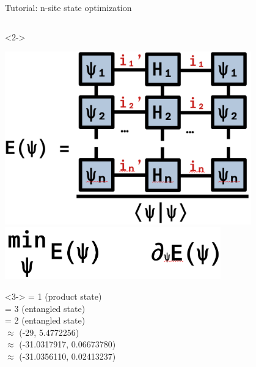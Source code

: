 \begin{frame}[fragile]{Tutorial: n-site state optimization}
\begin{columns}
\begin{column}{5.5cm}
\begin{onlyenv}<2->
\vspace*{0.0cm}
\begin{center}
\includegraphics[width=0.8\textwidth]{
  slides/assets/psin_H_psin.png
} \\
\includegraphics[width=0.7\textwidth]{
  slides/assets/min_grad_E_psi.png
}
\end{center}
\vspace*{0.0cm}
\end{onlyenv}

\begin{onlyenv}<3->
= 1 (product state) \\
= 3 (entangled state) \\
= 2 (entangled state) \\
$\approx$ (-29, 5.4772256) \\
$\approx$ (-31.0317917, 0.06673780) \\
$\approx$ (-31.0356110, 0.02413237)
\end{onlyenv}

\end{column}

\end{columns}

\end{frame}
